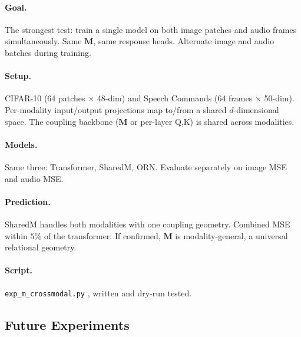\documentclass[11pt, a4paper]{article}
\newcommand{\M}{\mathbf{M}}
\theoremstyle{plain}
\theoremstyle{remark}
\begin{document}
\paragraph{Goal.}
The strongest test: train a single model on both image patches and audio frames simultaneously.
Same $\M$, same response heads.
Alternate image and audio batches during training.

\paragraph{Setup.}
CIFAR-10 (64 patches $\times$ 48-dim) and Speech Commands (64 frames $\times$ 50-dim).
Per-modality input/output projections map to/from a shared $d$-dimensional space.
The coupling backbone ($\M$ or per-layer Q,K) is shared across modalities.

\paragraph{Models.}
Same three: Transformer, SharedM, ORN.
Evaluate separately on image MSE and audio MSE.

\paragraph{Prediction.}
SharedM handles both modalities with one coupling geometry.
Combined MSE within $5\%$ of the transformer.
If confirmed, $\M$ is modality-general, a universal relational geometry.

\paragraph{Script.} \texttt{exp\_m\_crossmodal.py} ,  written and dry-run tested.

\subsection{Future Experiments}
\end{document}
